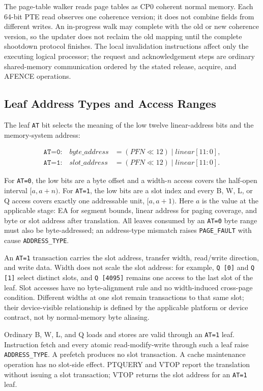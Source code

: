 The page-table walker reads page tables as CP0 coherent normal memory. Each 64-bit PTE read observes one coherence
version; it does not combine fields from different writes. An in-progress walk may complete with the old or new
coherence version, so the updater does not reclaim the old mapping until the complete shootdown protocol finishes.
The local invalidation instructions affect only the executing logical processor; the request and acknowledgement
steps are ordinary shared-memory communication ordered by the stated release, acquire, and AFENCE operations.

\subsection{Leaf Address Types and Access Ranges}
The leaf \texttt{AT} bit selects the meaning of the low twelve linear-address bits and the memory-system address:

\[
\begin{aligned}
\texttt{AT=0:}\quad \mathit{byte\_address} &= (\mathit{PFN}\ll12)\mathbin{|}\mathit{linear}[11:0],\\
\texttt{AT=1:}\quad \mathit{slot\_address} &= (\mathit{PFN}\ll12)\mathbin{|}\mathit{linear}[11:0].
\end{aligned}
\]

For \texttt{AT=0}, the low bits are a byte offset and a width-$n$ access covers the half-open interval
$[a,a+n)$. For \texttt{AT=1}, the low bits are a slot index and every B, W, L, or Q access covers exactly one
addressable unit, $[a,a+1)$. Here $a$ is the value at the applicable stage: EA for segment bounds, linear address
for paging coverage, and byte or slot address after translation. All leaves consumed by an \texttt{AT=0} byte range
must also be byte-addressed; an address-type mismatch raises \texttt{PAGE\_FAULT} with cause
\texttt{ADDRESS\_TYPE}.

An \texttt{AT=1} transaction carries the slot address, transfer width, read/write direction, and write data. Width
does not scale the slot address: for example, \texttt{Q [0]} and \texttt{Q [1]} select distinct slots, and
\texttt{Q [4095]} remains one access to the last slot of the leaf. Slot accesses have no byte-alignment rule and no
width-induced cross-page condition. Different widths at one slot remain transactions to that same slot; their
device-visible relationship is defined by the applicable platform or device contract, not by normal-memory byte
aliasing.

Ordinary B, W, L, and Q loads and stores are valid through an \texttt{AT=1} leaf. Instruction fetch and every atomic
read-modify-write through such a leaf raise \texttt{ADDRESS\_TYPE}. A prefetch produces no slot transaction. A cache
maintenance operation has no slot-side effect. PTQUERY and VTOP report the translation without issuing a slot
transaction; VTOP returns the slot address for an \texttt{AT=1} leaf.

